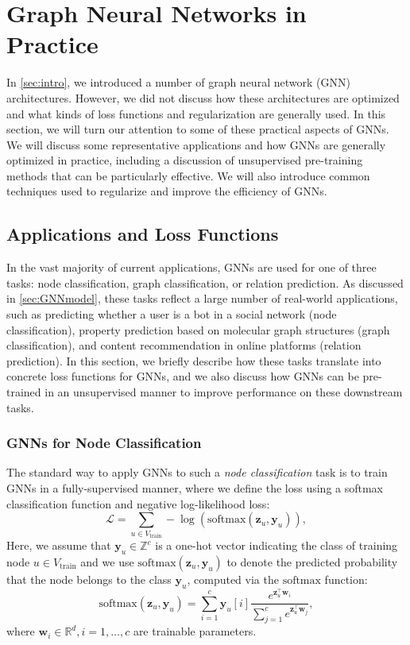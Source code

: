 \documentclass[10pt]{book}
\let\defaultmarginpar\marginpar
\renewcommand\marginpar[2][]{\defaultmarginpar{\itshape\color{gray}#2}}
\begin{document}
\section{Graph Neural Networks in Practice}

In \autoref{sec:intro}, we introduced a number of graph neural network (GNN) architectures. However, we did not discuss how these architectures are optimized and what kinds of loss functions and regularization are generally used. In this section, we will turn our attention to some of these practical aspects of GNNs. We will discuss some representative applications and how GNNs are generally optimized in practice, including a discussion of unsupervised pre-training methods that can be particularly effective. We will also introduce common techniques used to regularize and improve the efficiency of GNNs.

\subsection{Applications and Loss Functions}

In the vast majority of current applications, GNNs are used for one of three tasks: node classification, graph classification, or relation prediction. As discussed in \autoref{sec:GNNmodel}, these tasks reflect a large number of real-world applications, such as predicting whether a user is a bot in a social network (node classification), property prediction based on molecular graph structures (graph classification), and content recommendation in online platforms (relation prediction). In this section, we briefly describe how these tasks translate into concrete loss functions for GNNs, and we also discuss how GNNs can be pre-trained in an unsupervised manner to improve performance on these downstream tasks.

\subsubsection{GNNs for Node Classification}

The standard way to apply GNNs to such a \emph{node classification}\marginpar{node classification} task is to train GNNs in a fully-supervised manner, where we define the loss using a softmax classification function and negative log-likelihood loss:
\begin{equation}
    \mathcal L = \sum_{u \in V_\text{train}} -\log(\text{softmax}(\mathbf z_u, \mathbf y_u)),
\end{equation}
Here, we assume that $\mathbf y_u \in \mathbb Z^c$ is a one-hot vector indicating the class of training node $u \in V_\text{train}$ and we use $\text{softmax}(\mathbf z_u, \mathbf y_u)$ to denote the predicted probability that the node belongs to the class $\mathbf y_u$, computed via the $\text{softmax}$ function:
\begin{equation}
    \text{softmax}(\mathbf z_u, \mathbf y_u) = \sum^c_{i=1} \mathbf y_u[i] \frac{e^{\mathbf z_u^\top \mathbf w_i}}{\sum^c_{j=1} e^{\mathbf z_u^\top \mathbf w_j}},
    \label{eq:lossnodeclass}
\end{equation}
where $\mathbf w_i \in \mathbb R^d, i = 1, \ldots, c$ are trainable parameters.
\end{document}

